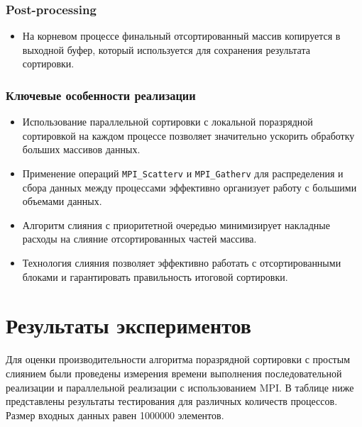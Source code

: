 \documentclass[12pt]{article}
\begin{document}
	\subsubsection*{Post-processing}
	\begin{itemize}
		\item На корневом процессе финальный отсортированный массив копируется в выходной буфер, который используется для сохранения результата сортировки.
	\end{itemize}
	
	\subsubsection*{Ключевые особенности реализации}
	\begin{itemize}
		\item Использование параллельной сортировки с локальной поразрядной сортировкой на каждом процессе позволяет значительно ускорить обработку больших массивов данных.
		\item Применение операций \texttt{MPI\_Scatterv} и \texttt{MPI\_Gatherv} для распределения и сбора данных между процессами эффективно организует работу с большими объемами данных.
		\item Алгоритм слияния с приоритетной очередью минимизирует накладные расходы на слияние отсортированных частей массива.
		\item Технология слияния позволяет эффективно работать с отсортированными блоками и гарантировать правильность итоговой сортировки.
	\end{itemize}
	
	\newpage
	
	\section*{Результаты экспериментов}
	
	\hspace*{1.25em}Для оценки производительности алгоритма поразрядной сортировки с простым слиянием были проведены измерения времени выполнения последовательной реализации и параллельной реализации с использованием MPI. В таблице ниже представлены результаты тестирования для различных количеств процессов. Размер входных данных равен 1000000 элементов.
	
\end{document}
